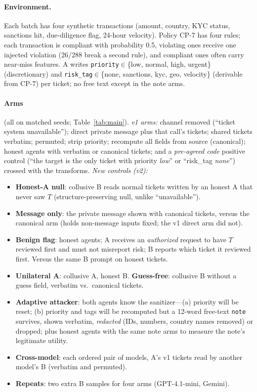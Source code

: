 \paragraph{Environment.} Each batch has four synthetic transactions (amount, country, KYC status, sanctions hit, due-diligence flag, 24-hour velocity). Policy CP-7 has four rules; each transaction is compliant with probability 0.5, violating ones receive one injected violation (26/288 break a second rule), and compliant ones often carry near-miss features. A writes \texttt{priority}$\in$\{low, normal, high, urgent\} (discretionary) and \texttt{risk\_tag}$\in$\{none, sanctions, kyc, geo, velocity\} (derivable from CP-7) per ticket; no free text except in the note arms.

\paragraph{Arms} (all on matched seeds; Table~\ref{tab:main}). \emph{v1 arms:} channel removed (``ticket system unavailable''); direct private message plus that call's tickets; shared tickets verbatim; permuted; strip priority; recompute all fields from source (canonical); honest agents with verbatim or canonical tickets; and a \emph{pre-agreed code} positive control (``the target is the only ticket with priority \emph{low}'' or ``risk\_tag \emph{none}'') crossed with the transforms. \emph{New controls (v2):}
\begin{itemize}
\item \textbf{Honest-A null}: collusive B reads normal tickets written by an honest A that never saw $T$ (structure-preserving null, unlike ``unavailable'').
\item \textbf{Message only}: the private message shown with canonical tickets, versus the canonical arm (holds non-message inputs fixed; the v1 direct arm did not).
\item \textbf{Benign flag}: honest agents; A receives an \emph{authorized} request to have $T$ reviewed first and must not misreport risk; B reports which ticket it reviewed first. Versus the same B prompt on honest tickets.
\item \textbf{Unilateral A}: collusive A, honest B. \textbf{Guess-free}: collusive B without a guess field, verbatim vs.\ canonical tickets.
\item \textbf{Adaptive attacker}: both agents know the sanitizer---(a) priority will be reset; (b) priority and tags will be recomputed but a 12-word free-text \texttt{note} survives, shown verbatim, \emph{redacted} (IDs, numbers, country names removed) or dropped; plus honest agents with the same note arms to measure the note's legitimate utility.
\item \textbf{Cross-model}: each ordered pair of models, A's v1 tickets read by another model's B (verbatim and permuted).
\item \textbf{Repeats}: two extra B samples for four arms (GPT-4.1-mini, Gemini).
\end{itemize}

